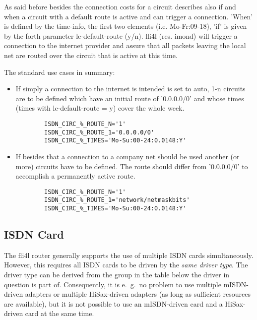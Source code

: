 As said before  besides the connection costs for 
a circuit describes also if and when a circuit with a default route is active 
and can trigger a connection. 'When' is defined by the time-info, the first 
two elements (i.e. Mo-Fr:09-18), 'if' is given by the forth parameter 
lc-default-route (y/n). fli4l (res. imond) will trigger a connection to the 
internet provider and assure that all packets leaving the local net are 
routed over the circuit that is active at this time. 

The standard use cases in summary: 

\begin{itemize}
\item If simply a connection to the internet is intended  
is set to auto, 1-n circuits are to be defined which have an initial route 
of '0.0.0.0/0' and whose times (times with lc-default-route = y) cover 
the whole week.
\begin{small}
\begin{example}
\begin{verbatim}
        ISDN_CIRC_%_ROUTE_N='1'
        ISDN_CIRC_%_ROUTE_1='0.0.0.0/0'
        ISDN_CIRC_%_TIMES='Mo-Su:00-24:0.0148:Y'
\end{verbatim}
\end{example}
\end{small}

\item If besides that a connection to a company net should be used another 
(or more) circuits have to be defined. The route should differ from '0.0.0.0/0' 
to accomplish a permanently active route.
\begin{small}
\begin{example}
\begin{verbatim}
        ISDN_CIRC_%_ROUTE_N='1'
        ISDN_CIRC_%_ROUTE_1='network/netmaskbits'
        ISDN_CIRC_%_TIMES='Mo-Su:00-24:0.0148:Y'
\end{verbatim}
\end{example}
\end{small}
\end{itemize}

\subsection{ISDN Card}

The fli4l router generally supports the use of multiple ISDN cards
simultaneously. However, this requires all ISDN cards to be driven by the
\emph{same driver type}. The driver type can be derived from the group in the
table below the driver in question is part of. Consequently, it is e.~g.\ no
problem to use multiple mISDN-driven adapters or multiple HiSax-driven adapters
(as long as sufficient resources are available), but it is not possible to use
an mISDN-driven card and a HiSax-driven card at the same time.

